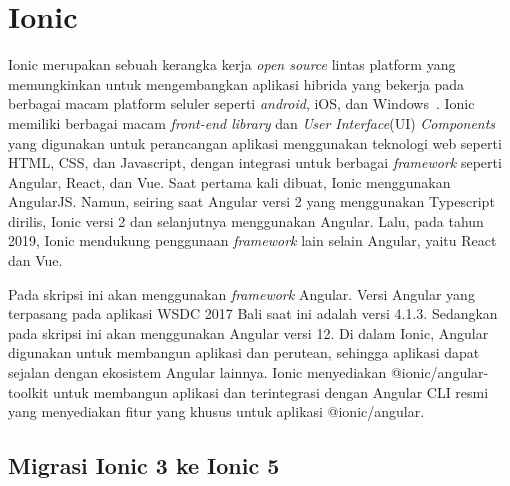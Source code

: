 \section{Ionic}
\label{sec:ionic} 
 
Ionic merupakan sebuah kerangka kerja {\it open source} lintas platform yang memungkinkan untuk mengembangkan aplikasi hibrida yang bekerja pada berbagai macam platform seluler seperti {\it android}, iOS, dan Windows~\cite{waranashiwar:18:ionic}. Ionic memiliki berbagai macam \textit{front-end library} dan \textit{User Interface}(UI) {\it Components} yang digunakan untuk  perancangan aplikasi menggunakan teknologi web seperti HTML, CSS, dan Javascript, dengan integrasi untuk berbagai \textit{framework} seperti Angular, React, dan Vue. Saat pertama kali dibuat, Ionic menggunakan AngularJS. Namun, seiring saat Angular versi 2 yang menggunakan Typescript dirilis, Ionic versi 2 dan selanjutnya menggunakan Angular. Lalu, pada tahun 2019, Ionic mendukung penggunaan \textit{framework} lain selain Angular, yaitu React dan Vue.

Pada skripsi ini akan menggunakan {\it framework} Angular. Versi Angular yang terpasang pada aplikasi WSDC 2017 Bali saat ini adalah versi 4.1.3. Sedangkan pada skripsi ini akan menggunakan Angular versi 12.  Di dalam Ionic, Angular digunakan untuk membangun aplikasi dan perutean, sehingga aplikasi dapat sejalan dengan ekosistem Angular lainnya. Ionic menyediakan @ionic/angular-toolkit untuk membangun aplikasi dan terintegrasi dengan Angular CLI resmi yang menyediakan fitur yang khusus untuk aplikasi @ionic/angular.


\subsection{Migrasi Ionic 3 ke Ionic 5}
\label{subsec:migrasi}

